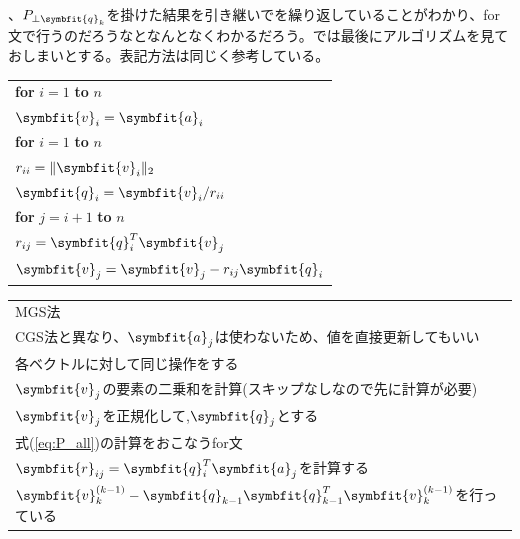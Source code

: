 、$P_{\bot \symbfit{q}_k}$を掛けた結果を引き継いでを繰り返していることがわかり、for文で行うのだろうなとなんとなくわかるだろう。では最後にアルゴリズムを見ておしまいとする。表記方法は同じく参考している。
\begin{tcolorbox}[colframe=black!80,colback=white,title=Modified Gram--Schmidt Algorithm]
\begin{minipage}[t]{0.34\textwidth}
\begin{table}[H]\centering
    \begin{tabular}{l}
        \textbf{for} $i=1$ \textbf{to} $n$\\
        \hspace{0.8cm} $\symbfit{v}_i=\symbfit{a}_i$\\
        \textbf{for} $i=1$ \textbf{to} $n$\\
        \hspace{0.8cm} $r_{ii}=\|\symbfit{v}_i\|_2$\\
        \hspace{0.8cm} $\symbfit{q}_i = \symbfit{v}_i/r_{ii}$\\
        \hspace{0.8cm} \textbf{for} $j=i+1$ \textbf{to} $n$\\
        \hspace{1.6cm} $r_{ij}=\symbfit{q}^T_i\symbfit{v}_j$\\
        \hspace{1.6cm} $\symbfit{v}_j=\symbfit{v}_j - r_{ij}\symbfit{q}_i$\\
    \end{tabular}
\end{table}
\end{minipage}\hfill
\begin{minipage}[t]{0.65\textwidth}
    \bigskip
    \begin{tabular}[H]{|l}
        MGS法 \\
        CGS法と異なり、$\symbfit{a}_j$は使わないため、値を直接更新してもいい\\
        各ベクトルに対して同じ操作をする\\
        $\symbfit{v}_j$の要素の二乗和を計算(スキップなしなので先に計算が必要)\\
        $\symbfit{v}_j$を正規化して,$\symbfit{q}_j$とする\\
        式(\ref{eq:P_all})の計算をおこなうfor文\\
        $\symbfit{r}_{ij}=\symbfit{q}_i^T\symbfit{a}_j$を計算する\\
        $\symbfit{v}_k^{(k-1)} - \symbfit{q}_{k-1} \symbfit{q}_{k-1}^T \symbfit{v}_k^{(k-1)} $を行っている\\
    \end{tabular}
    \bigskip
\end{minipage}
\end{tcolorbox}
\noindent
